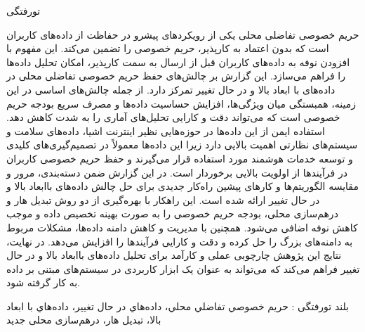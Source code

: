 


‌تورفتگی

حریم خصوصی تفاضلی محلی یکی از رویکردهای پیشرو در حفاظت از داده‌های کاربران است که بدون اعتماد به کارپذیر، حریم خصوصی را تضمین می‌کند. این مفهوم با افزودن نوفه به داده‌های کاربران قبل از ارسال به سمت کارپذیر، امکان تحلیل داده‌ها را فراهم می‌سازد. این گزارش بر چالش‌های حفظ حریم خصوصی تفاضلی محلی در داده‌های با ابعاد بالا و در حال تغییر تمرکز دارد. از جمله چالش‌های اساسی در این زمینه، همبستگی میان ویژگی‌ها، افزایش حساسیت داده‌ها و مصرف سریع بودجه حریم خصوصی است که می‌تواند دقت و کارایی تحلیل‌های آماری را به شدت کاهش دهد. استفاده ایمن از این داده‌ها در حوزه‌هایی نظیر اینترنت اشیا، داده‌های سلامت و سیستم‌های نظارتی اهمیت بالایی دارد زیرا این داده‌ها معمولاً در تصمیم‌گیری‌های کلیدی و توسعه خدمات هوشمند مورد استفاده قرار می‌گیرند و حفظ حریم خصوصی کاربران در فرآیندها از اولویت بالایی برخوردار است. در این گزارش ضمن دسته‌بندی، مرور و مقایسه الگوریتم‌ها و کارهای پیشین راه‌کار جدیدی برای حل چالش داده‌های با‌ابعاد بالا و در حال تغییر ارائه شده است. این راهکار با بهره‌گیری از دو روش تبدیل هار و درهم‌سازی محلی، بودجه حریم خصوصی را به صورت بهینه تخصیص داده و موجب کاهش نوفه اضافی می‌شود. همچنین با مدیریت و کاهش دامنه داده‌ها، مشکلات مربوط به دامنه‌های بزرگ را حل کرده و دقت و کارایی فرآیندها را افزایش می‌دهد. در نهایت، نتایج این پژوهش چارچوبی عملی و کارآمد برای تحلیل داده‌های با‌ابعاد بالا و در حال تغییر فراهم می‌کند که می‌تواند به عنوان یک ابزار کاربردی در سیستم‌های مبتنی بر داده به کار گرفته شود.

‌بلند
‌تورفتگی : 
ﺣﺮﻳﻢ ﺧﺼﻮﺻﻲ ﺗﻔﺎﺿﻠﻲ ﻣﺤﻠﻲ، ﺩﺍﺩﻩﻫﺎﻱ ﺩﺭ ﺣﺎﻝ ﺗﻐﻴﻴﺮ، ﺩﺍﺩﻩﻫﺎﻱ ﺑﺎ ﺍﺑﻌﺎﺩ ﺑﺎﻻ، تبدیل هار، درهم‌سازی محلی
‌جدید
